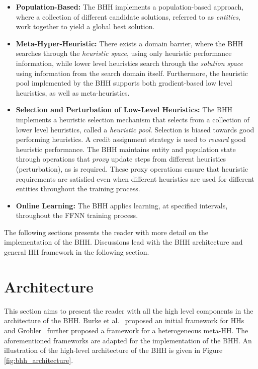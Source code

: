 \begin{itemize}
      \item \textbf{Population-Based:} The \acs{BHH} implements a population-based approach, where a collection of different candidate solutions, referred to as \textit{entities}, work together to yield a global best solution.

      \item \textbf{Meta-Hyper-Heuristic:} There exists a domain barrier, where the \acs{BHH} searches through the \textit{heuristic space}, using only heuristic performance information, while lower level heuristics search through the \textit{solution space} using information from the search domain itself. Furthermore, the heuristic pool implemented by the \acs{BHH} supports both gradient-based low level heuristics, as well as meta-heuristics.

      \item \textbf{Selection and Perturbation of Low-Level Heuristics:} The \acs{BHH} implements a heuristic selection mechanism that selects from a collection of lower level heuristics, called a \textit{heuristic pool}. Selection is biased towards good performing heuristics. A credit assignment strategy is used to \textit{reward} good heuristic performance. The \acs{BHH} maintains entity and population state through operations that \textit{proxy} update steps from different heuristics (perturbation), as is required. These proxy operations ensure that heuristic requirements are satisfied even when different heuristics are used for different entities throughout the training process.

      \item \textbf{Online Learning:} The \acs{BHH} applies learning, at specified intervals, throughout the \acs{FFNN} training process.
\end{itemize}

The following sections presents the reader with more detail on the implementation of the \acs{BHH}. Discussions lead with the \acs{BHH} architecture and general \acs{HH} framework in the following section.

\section{Architecture}\label{sec:bhh:architecture}

This section aims to present the reader with all the high level components in the architecture of the \Acs{BHH}. Burke et al.~\cite{ref:burke:2010} proposed an initial framework for \acp{HH} and Grobler~\cite{ref:grobler:2015} further proposed a framework for a heterogeneous meta-\ac{HH}. The aforementioned frameworks are adapted for the implementation of the \Acs{BHH}. An illustration of the high-level architecture of the \Acs{BHH} is given in Figure \ref{fig:bhh_architecture}.

